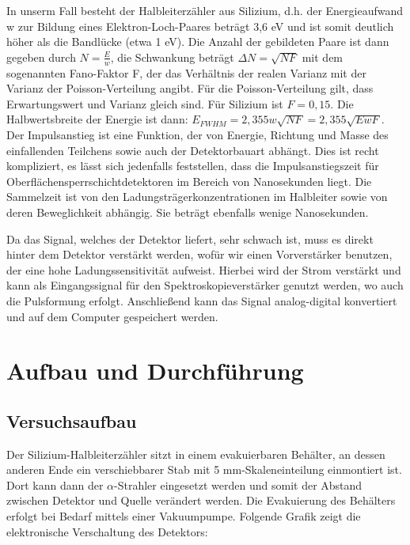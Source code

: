\documentclass[bigchapter,colorback,accentcolor=tud4b,linedtoc,11pt]{tudreport}
\begin{document}
In unserm Fall besteht der Halbleiterzähler aus Silizium, d.h. der Energieaufwand w zur Bildung eines Elektron-Loch-Paares beträgt 3,6 eV und ist somit deutlich höher als die Bandlücke (etwa 1 eV). Die Anzahl der gebildeten Paare ist dann gegeben durch $N = \frac{E}{w}$, die Schwankung beträgt $\Delta N = \sqrt{N F}$ mit dem sogenannten Fano-Faktor F, der das Verhältnis der realen Varianz mit der Varianz der Poisson-Verteilung angibt. Für die Poisson-Verteilung gilt, dass Erwartungswert und Varianz gleich sind. Für Silizium ist $F = 0,15$. Die Halbwertsbreite der Energie ist dann: $E_{FWHM} = 2,355 w \sqrt{N F} = 2,355 \sqrt{E w F}$.
Der Impulsanstieg ist eine Funktion, der von Energie, Richtung und Masse des einfallenden Teilchens sowie auch der Detektorbauart abhängt. Dies ist recht kompliziert, es lässt sich jedenfalls feststellen, dass die Impulsanstiegszeit für Oberflächensperrschichtdetektoren im Bereich von Nanosekunden liegt. Die Sammelzeit ist von den Ladungsträgerkonzentrationen im Halbleiter sowie von deren Beweglichkeit abhängig. Sie beträgt ebenfalls wenige Nanosekunden.

Da das Signal, welches der Detektor liefert, sehr schwach ist, muss es direkt hinter dem Detektor verstärkt werden, wofür wir einen Vorverstärker benutzen, der eine hohe Ladungssensitivität aufweist. Hierbei wird der Strom verstärkt und kann als Eingangssignal für den Spektroskopieverstärker genutzt werden, wo auch die Pulsformung erfolgt. Anschließend kann das Signal analog-digital konvertiert und auf dem Computer gespeichert werden. \cite{Halbleitert}

\chapter{Aufbau und Durchführung}

\section{Versuchsaufbau}

Der Silizium-Halbleiterzähler sitzt in einem evakuierbaren Behälter, an dessen anderen Ende ein verschiebbarer Stab mit 5 mm-Skaleneinteilung einmontiert ist. Dort kann dann der $\alpha$-Strahler eingesetzt werden und somit der Abstand zwischen Detektor und Quelle verändert werden. Die Evakuierung des Behälters erfolgt bei Bedarf mittels einer Vakuumpumpe. Folgende Grafik zeigt die elektronische Verschaltung des Detektors: 
\end{document}
